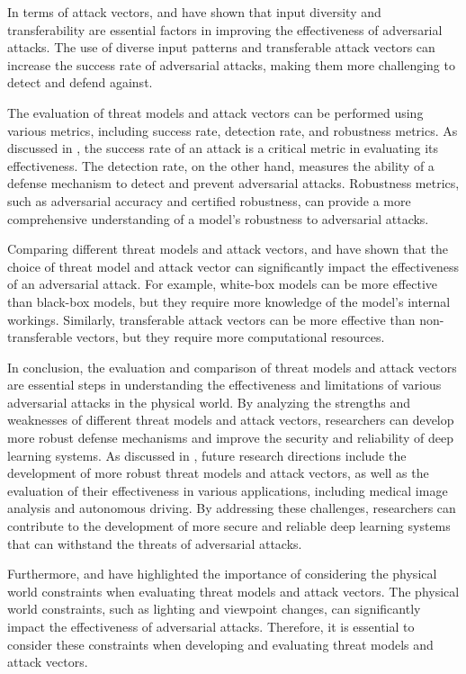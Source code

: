 \documentclass[11pt,a4paper]{article}
\begin{document}
In terms of attack vectors, \cite{doi:10.1109/cvpr.2019.00284} and \cite{doi:10.24963/ijcai.2019/134} have shown that input diversity and transferability are essential factors in improving the effectiveness of adversarial attacks. The use of diverse input patterns and transferable attack vectors can increase the success rate of adversarial attacks, making them more challenging to detect and defend against.

The evaluation of threat models and attack vectors can be performed using various metrics, including success rate, detection rate, and robustness metrics. As discussed in \cite{doi:10.3390/bdcc8010008}, the success rate of an attack is a critical metric in evaluating its effectiveness. The detection rate, on the other hand, measures the ability of a defense mechanism to detect and prevent adversarial attacks. Robustness metrics, such as adversarial accuracy and certified robustness, can provide a more comprehensive understanding of a model's robustness to adversarial attacks.

Comparing different threat models and attack vectors, \cite{doi:10.1016/j.eng.2019.12.012} and \cite{doi:10.3390/electronics10172132} have shown that the choice of threat model and attack vector can significantly impact the effectiveness of an adversarial attack. For example, white-box models can be more effective than black-box models, but they require more knowledge of the model's internal workings. Similarly, transferable attack vectors can be more effective than non-transferable vectors, but they require more computational resources.

In conclusion, the evaluation and comparison of threat models and attack vectors are essential steps in understanding the effectiveness and limitations of various adversarial attacks in the physical world. By analyzing the strengths and weaknesses of different threat models and attack vectors, researchers can develop more robust defense mechanisms and improve the security and reliability of deep learning systems. As discussed in \cite{doi:10.1145/3702638}, future research directions include the development of more robust threat models and attack vectors, as well as the evaluation of their effectiveness in various applications, including medical image analysis and autonomous driving. By addressing these challenges, researchers can contribute to the development of more secure and reliable deep learning systems that can withstand the threats of adversarial attacks.

Furthermore, \cite{doi:10.24963/ijcai.2021/694} and \cite{doi:10.1016/j.sysarc.2020.101766} have highlighted the importance of considering the physical world constraints when evaluating threat models and attack vectors. The physical world constraints, such as lighting and viewpoint changes, can significantly impact the effectiveness of adversarial attacks. Therefore, it is essential to consider these constraints when developing and evaluating threat models and attack vectors.
\end{document}
